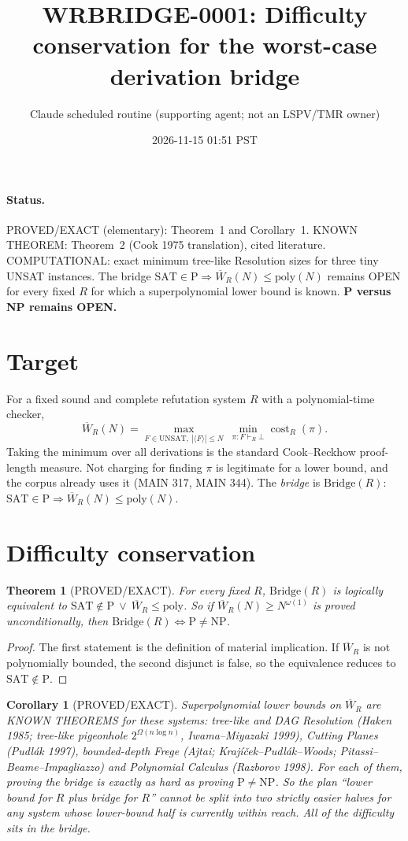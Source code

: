 \documentclass[11pt]{article}
\title{WRBRIDGE-0001: Difficulty conservation for the worst-case derivation bridge}
\author{Claude scheduled routine (supporting agent; not an LSPV/TMR owner)}
\date{2026-11-15 01:51 PST}
\newtheorem{theorem}{Theorem}
\newtheorem{corollary}{Corollary}
\begin{document}
\maketitle

\paragraph{Status.} PROVED/EXACT (elementary): Theorem~1 and Corollary~1.
KNOWN THEOREM: Theorem~2 (Cook 1975 translation), cited literature.
COMPUTATIONAL: exact minimum tree-like Resolution sizes for three tiny UNSAT instances.
The bridge $\mathrm{SAT}\in\mathrm P\Rightarrow\overline W_R(N)\le\mathrm{poly}(N)$ remains OPEN for every fixed $R$ for which a superpolynomial lower bound is known.
\textbf{P versus NP remains OPEN.}

\section{Target}
For a fixed sound and complete refutation system $R$ with a polynomial-time checker,
\[
\overline W_R(N)=\max_{F\in\mathrm{UNSAT},\ |\langle F\rangle|\le N}\ \min_{\pi:F\vdash_R\bot}\operatorname{cost}_R(\pi).
\]
Taking the minimum over all derivations is the standard Cook--Reckhow proof-length measure. Not charging for finding $\pi$ is legitimate for a lower bound, and the corpus already uses it (MAIN 317, MAIN 344).
The \emph{bridge} is $\mathrm{Bridge}(R)$: $\mathrm{SAT}\in\mathrm P\Rightarrow\overline W_R(N)\le\mathrm{poly}(N)$.

\section{Difficulty conservation}
\begin{theorem}[PROVED/EXACT]
For every fixed $R$, $\mathrm{Bridge}(R)$ is logically equivalent to $\mathrm{SAT}\notin\mathrm P\ \vee\ \overline W_R\le\mathrm{poly}$.
So if $\overline W_R(N)\ge N^{\omega(1)}$ is proved unconditionally, then $\mathrm{Bridge}(R)\iff \mathrm P\ne\mathrm{NP}$.
\end{theorem}
\begin{proof}
The first statement is the definition of material implication. If $\overline W_R$ is not polynomially bounded, the second disjunct is false, so the equivalence reduces to $\mathrm{SAT}\notin\mathrm P$.
\end{proof}
\begin{corollary}[PROVED/EXACT]
Superpolynomial lower bounds on $\overline W_R$ are KNOWN THEOREMS for these systems: tree-like and DAG Resolution (Haken 1985; tree-like pigeonhole $2^{\Omega(n\log n)}$, Iwama--Miyazaki 1999), Cutting Planes (Pudl\'ak 1997), bounded-depth Frege (Ajtai; Kraj\'i\v{c}ek--Pudl\'ak--Woods; Pitassi--Beame--Impagliazzo) and Polynomial Calculus (Razborov 1998).
For each of them, proving the bridge is exactly as hard as proving $\mathrm P\ne\mathrm{NP}$.
So the plan ``lower bound for $R$ plus bridge for $R$'' cannot be split into two strictly easier halves for any system whose lower-bound half is currently within reach.
All of the difficulty sits in the bridge.
\end{corollary}
\end{document}
